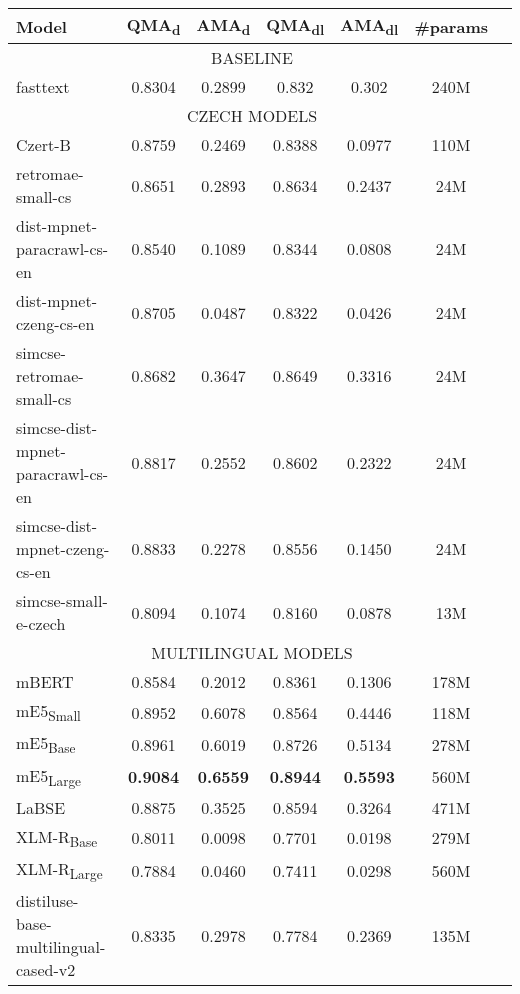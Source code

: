 \begin{table*}[ht!]
    \centering
    \begin{tabular}{lcccccc}
      \toprule
      \textbf{Model} & \textbf{QMA}\textsubscript{d} & \textbf{AMA}\textsubscript{d} & \textbf{QMA}\textsubscript{dl} & \textbf{AMA}\textsubscript{dl} & \textbf{\#params} \\
      \midrule
      \multicolumn{6}{c}{BASELINE} \\
      \hline
      fasttext & 0.8304 & 0.2899 & 0.832 & 0.302 & 240M \\
      \hline
      \multicolumn{6}{c}{CZECH MODELS} \\
      \hline
      Czert-B & 0.8759 & 0.2469 & 0.8388 & 0.0977 & 110M \\
      retromae-small-cs & 0.8651 & 0.2893 & 0.8634 & 0.2437 & 24M \\
      dist-mpnet-paracrawl-cs-en & 0.8540 & 0.1089 & 0.8344 & 0.0808 & 24M \\
      dist-mpnet-czeng-cs-en & 0.8705 & 0.0487 & 0.8322 & 0.0426 & 24M \\
      simcse-retromae-small-cs & 0.8682 & 0.3647 & 0.8649 & 0.3316 & 24M \\
      simcse-dist-mpnet-paracrawl-cs-en & 0.8817 & 0.2552 & 0.8602 & 0.2322 & 24M \\
      simcse-dist-mpnet-czeng-cs-en & 0.8833 & 0.2278 & 0.8556 & 0.1450 & 24M \\
      simcse-small-e-czech & 0.8094 & 0.1074 & 0.8160 & 0.0878 & 13M \\
      \hline
      \multicolumn{6}{c}{MULTILINGUAL MODELS} \\
      \hline
      mBERT & 0.8584 & 0.2012 & 0.8361 & 0.1306 & 178M \\
      mE5\textsubscript{Small} & 0.8952 & 0.6078 & 0.8564 & 0.4446 & 118M \\
      mE5\textsubscript{Base} & 0.8961 & 0.6019 & 0.8726 & 0.5134 & 278M \\
      mE5\textsubscript{Large} & \textbf{0.9084} & \textbf{0.6559} & \textbf{0.8944} & \textbf{0.5593} & 560M \\
      LaBSE & 0.8875 & 0.3525 & 0.8594 & 0.3264 & 471M \\
      XLM-R\textsubscript{Base} & 0.8011 & 0.0098 & 0.7701 & 0.0198 & 279M \\
      XLM-R\textsubscript{Large} & 0.7884 & 0.0460 & 0.7411 & 0.0298 & 560M \\
      distiluse-base-multilingual-cased-v2 & 0.8335 & 0.2978 & 0.7784 & 0.2369 & 135M \\

\end{tabular}
\end{table*}
